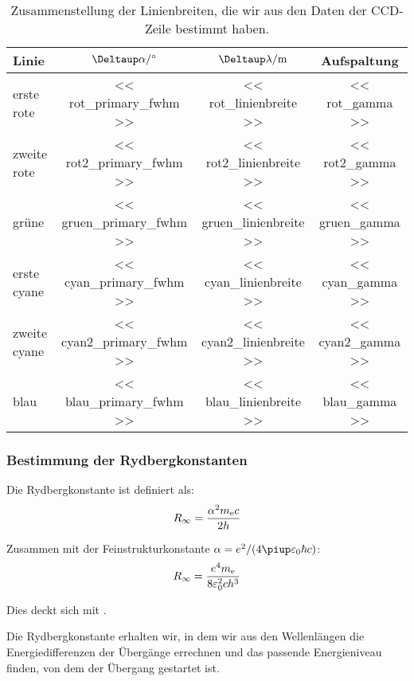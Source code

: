\begin{landscape}

\begin{table}[htbp]
    \centering
    \begin{tabular}{lSSS}
        Linie & {$\Deltaup\alpha / \si\degree$} & {$\Deltaup\lambda /
    \si\meter$} & {Aufspaltung} \\
        \midrule
        erste rote & << rot_primary_fwhm >> & << rot_linienbreite >> & <<
        rot_gamma >> \\
        zweite rote & << rot2_primary_fwhm >> & << rot2_linienbreite >> & <<
        rot2_gamma >> \\
        grüne & << gruen_primary_fwhm >> & << gruen_linienbreite >> & <<
        gruen_gamma >> \\
        erste cyane & << cyan_primary_fwhm >> & << cyan_linienbreite >> & <<
        cyan_gamma >> \\
        zweite cyane & << cyan2_primary_fwhm >> & << cyan2_linienbreite >> & <<
        cyan2_gamma >> \\
        blau & << blau_primary_fwhm >> & << blau_linienbreite >> & <<
        blau_gamma >> \\
    \end{tabular}
    \caption{%
        Zusammenstellung der Linienbreiten, die wir aus den Daten der CCD-Zeile
        bestimmt haben.
    }
    \label{tab:linienbreiten}
\end{table}

\end{landscape}

\subsubsection{Bestimmung der Rydbergkonstanten}

Die Rydbergkonstante ist definiert als: \parencite[Umschlag]{meschede-gerthsen_24}
\[
    R_\infty = \frac{\alpha^2 m_\text e c}{2 h}
\]

Zusammen mit der Feinstrukturkonstante $\alpha = e^2/(4\piup \varepsilon_0
\hbar c)$: \parencite[Umschlag]{meschede-gerthsen_24}
\[
    R_\infty = \frac{e^4 m_\text e}{8 \varepsilon_0^2 c h^3}
\]

Dies deckt sich mit \cite{wikipedia/Rydbergkonstante}.

Die Rydbergkonstante erhalten wir, in dem wir aus den Wellenlängen die
Energiedifferenzen der Übergänge errechnen und das passende Energieniveau
finden, von dem der Übergang gestartet ist.

